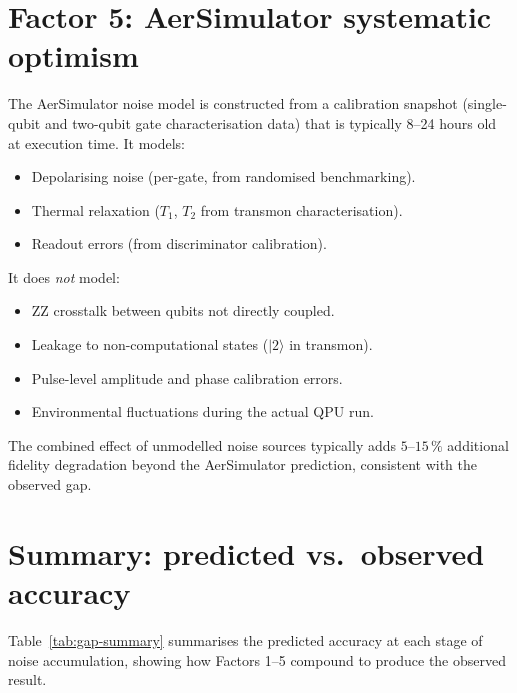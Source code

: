 \documentclass[11pt,a4paper, english]{book}
\theoremstyle{plain}
\theoremstyle{definition}
\numberwithin{equation}{chapter}
\numberwithin{figure}{chapter}
\numberwithin{table}{chapter}
\begin{document}
\section{Factor 5: AerSimulator systematic optimism}
\label{app:gap-aer-systematic}

The AerSimulator noise model is constructed from a calibration snapshot 
(single-qubit and two-qubit gate characterisation data) that is typically 
8--24 hours old at execution time.  It models:
\begin{itemize}
  \item Depolarising noise (per-gate, from randomised benchmarking).
  \item Thermal relaxation ($T_1$, $T_2$ from transmon characterisation).
  \item Readout errors (from discriminator calibration).
\end{itemize}
It does \emph{not} model:
\begin{itemize}
  \item ZZ crosstalk between qubits not directly coupled.
  \item Leakage to non-computational states ($|2\rangle$ in transmon).
  \item Pulse-level amplitude and phase calibration errors.
  \item Environmental fluctuations during the actual QPU run.
\end{itemize}
The combined effect of unmodelled noise sources typically adds 
$5$--$15\,\%$ additional fidelity degradation beyond the AerSimulator 
prediction, consistent with the observed gap.

\section{Summary: predicted vs.\ observed accuracy}
\label{app:gap-summary}

Table~\ref{tab:gap-summary} summarises the predicted accuracy at each 
stage of noise accumulation, showing how Factors 1--5 compound to 
produce the observed result.
\end{document}
